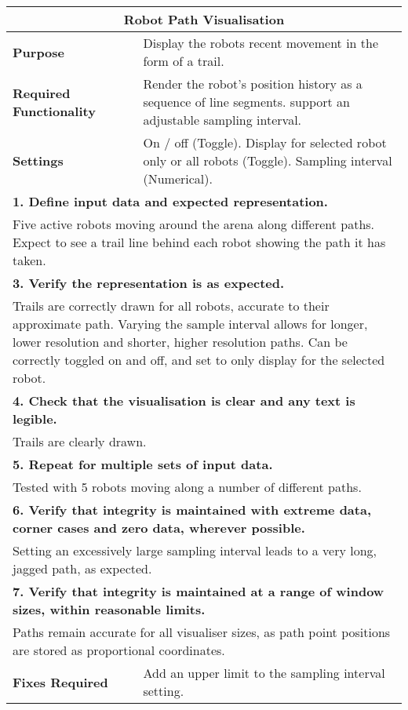 \begin{longtable}{ l p{10cm} }
 \hline
 \multicolumn{2}{c}{\textbf{Robot Path Visualisation}}\\
 \hline
 \textbf{Purpose} & Display the robots recent movement in the form of a trail.\\
 \textbf{Required Functionality} & Render the robot's position history as a sequence of line segments. support an adjustable sampling interval.\\
 \textbf{Settings} & On / off (Toggle). Display for selected robot only or all robots (Toggle). Sampling interval (Numerical).\\
 \hline
 \multicolumn{2}{p{14cm}}{\textbf{1. Define input data and expected representation.}}\\
 \multicolumn{2}{p{14cm}}{Five active robots moving around the arena along different paths. Expect to see a trail line behind each robot showing the path it has taken.}\\
 \hline
 \multicolumn{2}{p{14cm}}{\textbf{3. Verify the representation is as expected.}}\\
 \multicolumn{2}{p{14cm}}{Trails are correctly drawn for all robots, accurate to their approximate path. Varying the sample interval allows for longer, lower resolution and shorter, higher resolution paths. Can be correctly toggled on and off, and set to only display for the selected robot.}\\
 \hline
 \multicolumn{2}{p{14cm}}{\textbf{4. Check that the visualisation is clear and any text is legible.}}\\
 \multicolumn{2}{p{14cm}}{Trails are clearly drawn.}\\
 \hline
 \multicolumn{2}{p{14cm}}{\textbf{5. Repeat for multiple sets of input data.}}\\
 \multicolumn{2}{p{14cm}}{Tested with 5 robots moving along a number of different paths.}\\
 \hline
 \multicolumn{2}{p{14cm}}{\textbf{6. Verify that integrity is maintained with extreme data, corner cases and zero data, wherever possible.}}\\
 \multicolumn{2}{p{14cm}}{Setting an excessively large sampling interval leads to a very long, jagged path, as expected.}\\
 \hline
 \multicolumn{2}{p{14cm}}{\textbf{7. Verify that integrity is maintained at a range of window sizes, within reasonable limits.}}\\
 \multicolumn{2}{p{14cm}}{Paths remain accurate for all visualiser sizes, as path point positions are stored as proportional coordinates.}\\
 \hline
 \textbf{Fixes Required} & Add an upper limit to the sampling interval setting.\\
 \bottomrule
\end{longtable}
\clearpage

